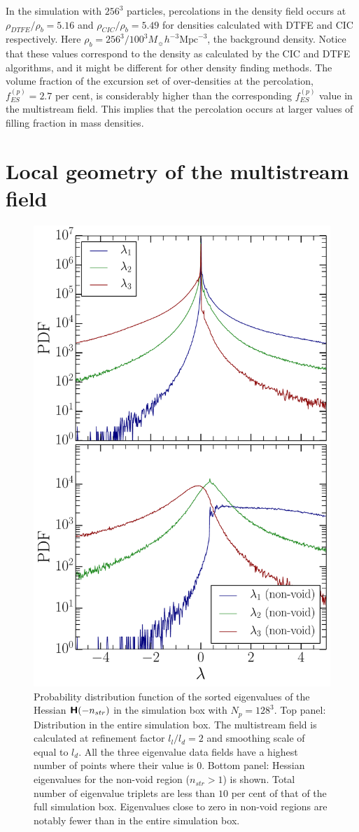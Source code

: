 \documentclass[fleqn,usenatbib,useAMS]{mnras}
\newcommand\hl{\bgroup\markoverwith
  {\textcolor{yellow}{\rule[-.5ex]{2pt}{2.5ex}}}\ULon}
\begin{document}
In the simulation with $256^3$ particles, percolations in the density field occurs at $\rho_{DTFE}/ \rho_b = 5.16 $ and $\rho_{CIC}/ \rho_b = 5.49 $ for densities calculated with DTFE and CIC respectively. Here $\rho_b = 256^3 / 100^3 M_{\sun} h^{-3} \text{Mpc}^{-3}$, the background density. Notice that these values correspond to the density as calculated by the CIC and DTFE algorithms, and it might be different for other density finding methods. The volume fraction of the excursion set of over-densities at the percolation, $f_{ES}^{(p)} = 2.7$ per cent, is considerably higher than the corresponding $f_{ES}^{(p)}$ value in the multistream field. This implies that the percolation occurs at larger values of filling fraction in mass densities. 




\section{Local geometry of the multistream field}
\label{sec:hessian}
\begin{figure}
\begin{minipage}[t]{.99\linewidth}
  \centering\includegraphics[width=8.cm]{fig6.pdf} 

\end{minipage}\hfill
\caption{Probability distribution function of the sorted eigenvalues of the Hessian $\textbf{\textsf{H}}(-n_{str})$ in the simulation box with $N_p = 128^3$. Top panel: Distribution in the entire simulation box. The multistream field is calculated at refinement factor $l_l/l_d= 2$ and smoothing scale of equal to $l_d$. All the three eigenvalue data fields have a highest number of points where their value is 0. Bottom panel: Hessian eigenvalues for the non-void region ($n_{str} > 1$) is shown. Total number of eigenvalue triplets are less than $10$ per cent of that of the full simulation box. Eigenvalues close to zero in non-void regions are notably fewer than in the entire simulation box.}
\label{fig:lambdasPDF}
\end{figure}
\end{document}
